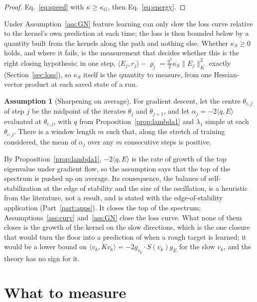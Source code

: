 \documentclass[11pt]{article}
\theoremstyle{definition}
\newtheorem{assumption}{Assumption}
\theoremstyle{remark}
\newcommand{\ip}[2]{\langle #1,#2\rangle}
\begin{document}
\begin{proof}
Eq.~\eqref{eq:speed} with $\kappa\ge\kappa_G$, then Eq.~\eqref{eq:energy}.
\end{proof}

Under Assumption~\ref{ass:GN} feature learning can only slow the loss curve relative to the kernel's own prediction at each time; the loss is then bounded below by a quantity built from the kernels along the path and nothing else.
Whether $\kappa_S\ge0$ holds, and where it fails, is the measurement that decides whether this is the right closing hypothesis; in one step, $\ip{E_j}{r_j} - \varrho_j = \frac{\eta^2}{2}\kappa_S\|E_j\|_K^2$ exactly (Section~\ref{sec:loss}), so $\kappa_S$ itself is the quantity to measure, from one Hessian-vector product at each saved state of a run.

\begin{assumption}[Sharpening on average]\label{ass:sharp}
For gradient descent, let the centre $\theta_{c,j}$ of step $j$ be the midpoint of the iterates $\theta_j$ and $\theta_{j+1}$, and let $\alpha_j = -2\ip{q}{E}$ evaluated at $\theta_{c,j}$, with $q$ from Proposition~\ref{prop:lambda1} and $\lambda_1$ simple at each $\theta_{c,j}$.
There is a window length $m$ such that, along the stretch of training considered, the mean of $\alpha_j$ over any $m$ consecutive steps is positive.
\end{assumption}

By Proposition~\ref{prop:lambda1}, $-2\ip{q}{E}$ is the rate of growth of the top eigenvalue under gradient flow, so the assumption says that the top of the spectrum is pushed up on average.
Its consequence, the balance of self-stabilization at the edge of stability and the size of the oscillation, is a heuristic from the literature, not a result, and is stated with the edge-of-stability application (Part~\ref{part:apps}).
It closes the top of the spectrum; Assumptions~\ref{ass:curv} and~\ref{ass:GN} close the loss curve.
What none of them closes is the growth of the kernel on the slow directions, which is the one closure that would turn the floor into a prediction of when a rough target is learned; it would be a lower bound on $\ip{v_k}{\dot Kv_k} = -2g_{v_k}\cdot S(v_k)g_E$ for the slow $v_k$, and the theory has no sign for it.

\section{What to measure}\label{sec:measure}
\end{document}
